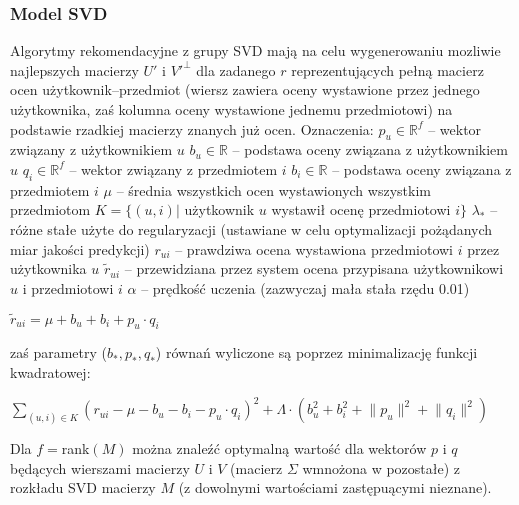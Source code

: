 \documentclass{pracamgr}
\begin{document}
    \subsubsection{Model SVD}
     Algorytmy rekomendacyjne z grupy SVD mają na celu wygenerowaniu mozliwie
     najlepszych macierzy $U'$ i $V'^\bot$ dla zadanego $r$ reprezentujących pełną macierz ocen użytkownik--przedmiot
     (wiersz zawiera oceny wystawione przez jednego użytkownika, zaś kolumna oceny wystawione jednemu przedmiotowi)
     na podstawie rzadkiej macierzy znanych już ocen.\newline
     Oznaczenia:\newline
     $p_u\in\mathbb{R}^f$ -- wektor związany z użytkownikiem $u$\newline
     $b_u\in\mathbb{R}$ -- podstawa oceny związana z użytkownikiem $u$\newline
     $q_i\in\mathbb{R}^f$ -- wektor związany z przedmiotem $i$\newline
     $b_i\in\mathbb{R}$ -- podstawa oceny związana z przedmiotem $i$\newline
     $\mu$ -- średnia wszystkich ocen wystawionych wszystkim przedmiotom\newline
     $K=\{(u,i)|$ użytkownik $u$ wystawił ocenę przedmiotowi $i\}$\newline
     $\lambda_{*}$ -- różne stałe użyte do regularyzacji (ustawiane w celu optymalizacji pożądanych miar jakości predykcji)\newline 
     $r_{ui}$ -- prawdziwa ocena wystawiona przedmiotowi $i$ przez użytkownika $u$\newline
     $\tilde{r}_{ui}$ -- przewidziana przez system ocena przypisana użytkownikowi $u$ i przedmiotowi $i$\newline
     $\alpha$ -- prędkość uczenia (zazwyczaj mała stała rzędu 0.01)\newline
     \begin{center}
     $\tilde{r}_{ui}=\mu+b_u+b_i+p_u\cdot q_i$
     \end{center}
     zaś parametry ($b_*,p_*,q_*$) równań wyliczone są poprzez minimalizację funkcji kwadratowej:
     \begin{center}
     $\sum\limits_{(u,i)\in K}(r_{ui}-\mu-b_u-b_i-p_u\cdot q_i)^2+\Lambda\cdot(b_u^2+b_i^2+\lVert p_u\rVert^2+\lVert q_i\rVert^2)$
     \end{center}
     Dla $f=$rank$(M)$ można znaleźć optymalną wartość dla wektorów $p$ i $q$ będących wierszami macierzy $U$ i $V$
     (macierz $\Sigma$ wmnożona w pozostałe) z rozkładu SVD macierzy $M$ (z dowolnymi wartościami zastępuącymi nieznane).
\end{document}
